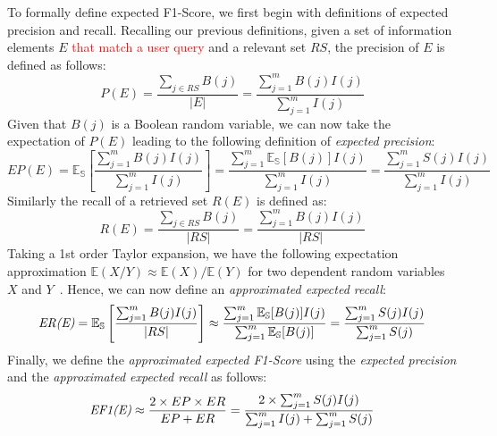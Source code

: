 To formally define expected F1-Score, we first begin with definitions of expected precision and recall.  Recalling our previous definitions, given a set of information elements  $E$  \textcolor{red}{that match a user query} and a relevant set $RS$, %
the precision of $E$ is defined as follows:
\begin{equation}
   P(E) = \dfrac{\sum_{j \in RS} B(j)}{|E|} = \dfrac{\sum_{j=1}^m B(j)I(j)}{\sum_{j=1}^m I(j)} 
\end{equation}
Given that $B(j)$ is a Boolean random variable, we can now take the expectation of $P(E)$ leading to the following definition of 
\emph{expected precision}: 
\begin{equation}
EP(E)=\mathbb{E_{S}} \left[ \dfrac{\sum_{j=1}^{m}B(j)I(j)}{\sum_{j=1}^{m}I(j)} \right]=\dfrac{\sum_{j=1}^{m}\mathbb{E_{S}}[B(j)]I(j)}{\sum_{j=1}^{m}I(j)}=\dfrac{\sum_{j=1}^{m}S(j)I(j)}{\sum_{j=1}^{m}I(j)}
\end{equation}
Similarly the recall of a retrieved set $R(E)$ is defined as:
\begin{equation}
   R(E) = \dfrac{\sum_{j \in RS} B(j)}{|RS|} = \dfrac{\sum_{j=1}^m B(j)I(j)}{|RS|} 
\end{equation}
Taking a 1st order Taylor expansion, we have the following expectation approximation %
$\mathbb{E}(X/Y)\approx \mathbb{E}(X)/ \mathbb{E}(Y)$ for two dependent random variables $X$ and $Y$~\cite{Kempen2000}. Hence, 
we can now define an \emph{approximated expected recall}: 
\begin{equation}
   	\emph{ER(E)}=\mathbb{E_{S}} \left[ \dfrac{\sum_{j=1}^{m}B(j)I(j)}{|RS|} \right] \approx \dfrac{\sum_{j=1}^{m}\mathbb{E_{S}}[B(j)]I(j)}{\sum_{j=1}^m \mathbb{E_{S}}[B(j)]} = \dfrac{\sum_{j=1}^m S(j)I(j)}{\sum_{j=1}^m S(j)} 
\end{equation}
Finally, we define the \emph{approximated expected F1-Score} using the \emph{expected precision} and the \emph{approximated expected recall} as follows: 
\begin{align}
    \emph{EF1(E)}  \approx \dfrac{2\times EP\times ER}{EP+ER} = \dfrac{2\times\sum_{j=1}^m S(j)I(j)}{\sum_{j=1}^m I(j) + \sum_{j=1}^m S(j)}
\end{align}
  
